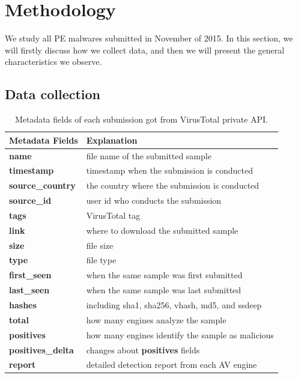 \section{Methodology}
\label{sec:meth}


We study all PE malwares submitted in November of 2015. 
In this section, we will firstly discuss how we collect data, 
and then we will present the general characteristics we observe.

\subsection{Data collection}

\begin{table}[h!]
\centering
\footnotesize
{
\begin{tabular}{l|l}
\hline
Metadata Fields & Explanation \\
\hline                            
{\bf name}      & file name of the submitted sample \\
{\bf timestamp} & timestamp when the submission is conducted \\
{\bf source\_country} & the country where the submission is conducted \\
{\bf source\_id} & user id who conducts the submission\\
{\bf tags} & VirusTotal tag \\
{\bf link} & where to download the submitted sample \\
{\bf size} & file size \\
{\bf type} & file type \\
{\bf first\_seen} & when the same sample was first submitted \\
{\bf last\_seen} & when the same sample was last submitted \\
{\bf hashes} & including sha1, sha256, vhash, md5, and ssdeep\\
{\bf total} & how many engines analyze the sample\\
{\bf positives} & how many engines identify the sample as malicious \\
{\bf positives\_delta} & changes about {\bf positives} fields \\
{\bf report} & detailed detection report from each AV engine \\
\hline

\end{tabular}
}
\caption{Metadata fields of each submission got from VirusTotal private API.}
\label{tab:fields}
\end{table}

